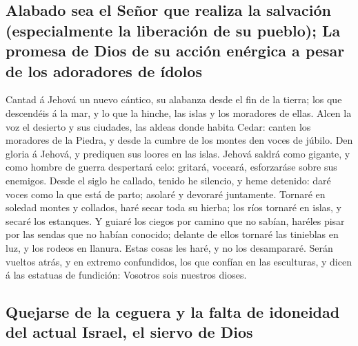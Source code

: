 \hypertarget{alabado-sea-el-seuxf1or-que-realiza-la-salvaciuxf3n-especialmente-la-liberaciuxf3n-de-su-pueblo-la-promesa-de-dios-de-su-acciuxf3n-enuxe9rgica-a-pesar-de-los-adoradores-de-uxeddolos}{%
\subsection{Alabado sea el Señor que realiza la salvación (especialmente
la liberación de su pueblo); La promesa de Dios de su acción enérgica a
pesar de los adoradores de
ídolos}\label{alabado-sea-el-seuxf1or-que-realiza-la-salvaciuxf3n-especialmente-la-liberaciuxf3n-de-su-pueblo-la-promesa-de-dios-de-su-acciuxf3n-enuxe9rgica-a-pesar-de-los-adoradores-de-uxeddolos}}

 Cantad á Jehová un nuevo cántico, su alabanza desde el
fin de la tierra; los que descendéis á la mar, y lo que la hinche, las
islas y los moradores de ellas.  Alcen la voz el desierto
y sus ciudades, las aldeas donde habita Cedar: canten los moradores de
la Piedra, y desde la cumbre de los montes den voces de júbilo.
 Den gloria á Jehová, y prediquen sus loores en las
islas.  Jehová saldrá como gigante, y como hombre de
guerra despertará celo: gritará, voceará, esforzaráse sobre sus
enemigos.  Desde el siglo he callado, tenido he silencio,
y heme detenido: daré voces como la que está de parto; asolaré y
devoraré juntamente.  Tornaré en soledad montes y
collados, haré secar toda su hierba; los ríos tornaré en islas, y secaré
los estanques.  Y guiaré los ciegos por camino que no
sabían, haréles pisar por las sendas que no habían conocido; delante de
ellos tornaré las tinieblas en luz, y los rodeos en llanura. Estas cosas
les haré, y no los desampararé.  Serán vueltos atrás, y
en extremo confundidos, los que confían en las esculturas, y dicen á las
estatuas de fundición: Vosotros sois nuestros dioses.

\hypertarget{quejarse-de-la-ceguera-y-la-falta-de-idoneidad-del-actual-israel-el-siervo-de-dios}{%
\subsection{Quejarse de la ceguera y la falta de idoneidad del actual
Israel, el siervo de
Dios}\label{quejarse-de-la-ceguera-y-la-falta-de-idoneidad-del-actual-israel-el-siervo-de-dios}}

